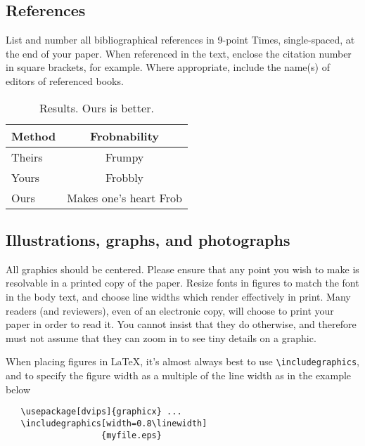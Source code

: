 \documentclass[12pt,letterpaper]{article}
\begin{document}
\subsection{References}

List and number all bibliographical references in 9-point Times,
single-spaced, at the end of your paper. When referenced in the text,
enclose the citation number in square brackets, for
example.  Where appropriate, include the name(s) of
editors of referenced books.

\begin{table}
\begin{center}
\begin{tabular}{|l|c|}
\hline
Method & Frobnability \\
\hline\hline
Theirs & Frumpy \\
Yours & Frobbly \\
Ours & Makes one's heart Frob\\
\hline
\end{tabular}
\end{center}
\caption{Results.   Ours is better.}
\end{table}

\subsection{Illustrations, graphs, and photographs}

All graphics should be centered.  Please ensure that any point you wish to
make is resolvable in a printed copy of the paper.  Resize fonts in figures
to match the font in the body text, and choose line widths which render
effectively in print.  Many readers (and reviewers), even of an electronic
copy, will choose to print your paper in order to read it.  You cannot
insist that they do otherwise, and therefore must not assume that they can
zoom in to see tiny details on a graphic.

When placing figures in \LaTeX, it's almost always best to use
\verb+\includegraphics+, and to specify the  figure width as a multiple of
the line width as in the example below
{\small\begin{verbatim}
   \usepackage[dvips]{graphicx} ...
   \includegraphics[width=0.8\linewidth]
                   {myfile.eps}
\end{verbatim}
}
\end{document}

